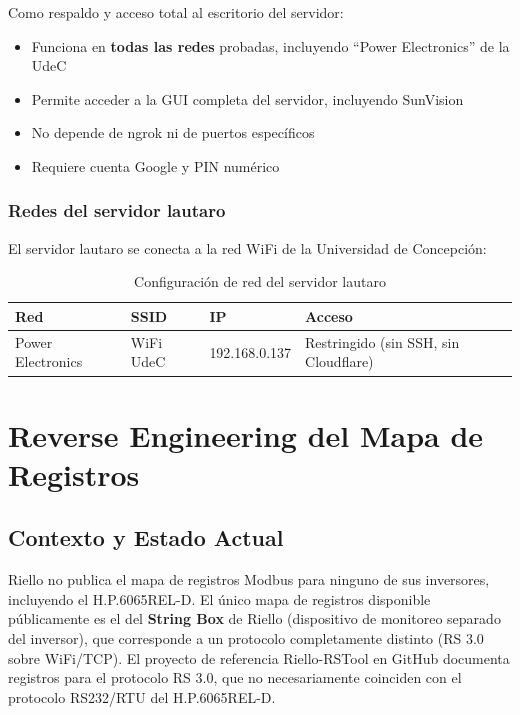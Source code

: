 \documentclass[12pt,a4paper]{article}
\begin{document}
Como respaldo y acceso total al escritorio del servidor:
\begin{itemize}
    \item Funciona en \textbf{todas las redes} probadas, incluyendo ``Power Electronics'' de la UdeC
    \item Permite acceder a la GUI completa del servidor, incluyendo SunVision
    \item No depende de ngrok ni de puertos espec\'ificos
    \item Requiere cuenta Google y PIN num\'erico
\end{itemize}

\subsubsection{Redes del servidor lautaro}

El servidor lautaro se conecta a la red WiFi de la Universidad de Concepci\'on:

\begin{table}[H]
\centering
\begin{tabular}{llll}
\toprule
\textbf{Red} & \textbf{SSID} & \textbf{IP} & \textbf{Acceso} \\
\midrule
Power Electronics & WiFi UdeC & 192.168.0.137 & Restringido (sin SSH, sin Cloudflare) \\
\bottomrule
\end{tabular}
\caption{Configuraci\'on de red del servidor lautaro}
\end{table}

\section{Reverse Engineering del Mapa de Registros}

\subsection{Contexto y Estado Actual}

Riello no publica el mapa de registros Modbus para ninguno de sus inversores, incluyendo el H.P.6065REL-D. El \'unico mapa de registros disponible p\'ublicamente es el del \textbf{String Box} de Riello (dispositivo de monitoreo separado del inversor), que corresponde a un protocolo completamente distinto (RS 3.0 sobre WiFi/TCP). El proyecto de referencia Riello-RSTool en GitHub documenta registros para el protocolo RS 3.0, que no necesariamente coinciden con el protocolo RS232/RTU del H.P.6065REL-D.
\end{document}
